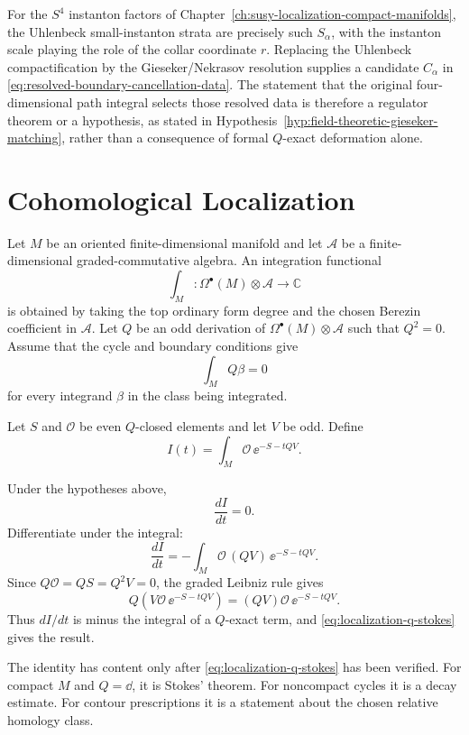 For the \(S^4\) instanton factors of
Chapter~\ref{ch:susy-localization-compact-manifolds}, the Uhlenbeck
small-instanton strata are precisely such \(S_\alpha\), with the instanton
scale playing the role of the collar coordinate \(r\).  Replacing the
Uhlenbeck compactification by the Gieseker/Nekrasov resolution supplies a
candidate \(C_\alpha\) in
\eqref{eq:resolved-boundary-cancellation-data}.  The statement that the
original four-dimensional path integral selects those resolved data is
therefore a regulator theorem or a hypothesis, as stated in
Hypothesis~\ref{hyp:field-theoretic-gieseker-matching}, rather than a
consequence of formal \(Q\)-exact deformation alone.

\section{Cohomological Localization}

Let \(M\) be an oriented finite-dimensional manifold and let
\(\mathcal A\) be a finite-dimensional graded-commutative algebra.  An
integration functional
\[
  \int_M:\Omega^\bullet(M)\otimes\mathcal A\longrightarrow\mathbb C
\]
is obtained by taking the top ordinary form degree and the chosen Berezin
coefficient in \(\mathcal A\).  Let \(Q\) be an odd derivation of
\(\Omega^\bullet(M)\otimes\mathcal A\) such that \(Q^2=0\).  Assume that the
cycle and boundary conditions give
\begin{equation}
  \int_M Q\beta=0
  \label{eq:localization-q-stokes}
\end{equation}
for every integrand \(\beta\) in the class being integrated.

Let \(S\) and \(\mathcal O\) be even \(Q\)-closed elements and let \(V\) be
odd.  Define
\[
  I(t)=\int_M \mathcal O\,\ee^{-S-tQV}.
\]

\begin{remark}
\label{rem:q-exact-localization-invariance}
Under the hypotheses above,
\[
  \frac{dI}{dt}=0 .
\]
Differentiate under the integral:
\[
  \frac{dI}{dt}
  =
  -\int_M \mathcal O\,(QV)\,\ee^{-S-tQV}.
\]
Since \(Q\mathcal O=QS=Q^2V=0\), the graded Leibniz rule gives
\[
  Q\!\left(V\mathcal O\,\ee^{-S-tQV}\right)
  =
  (QV)\mathcal O\,\ee^{-S-tQV}.
\]
Thus \(dI/dt\) is minus the integral of a \(Q\)-exact term, and
\eqref{eq:localization-q-stokes} gives the result.

The identity has content only after \eqref{eq:localization-q-stokes} has been
verified.  For compact \(M\) and \(Q=\dd\), it is Stokes' theorem.  For
noncompact cycles it is a decay estimate.  For contour prescriptions it is a
statement about the chosen relative homology class.
\end{remark}

